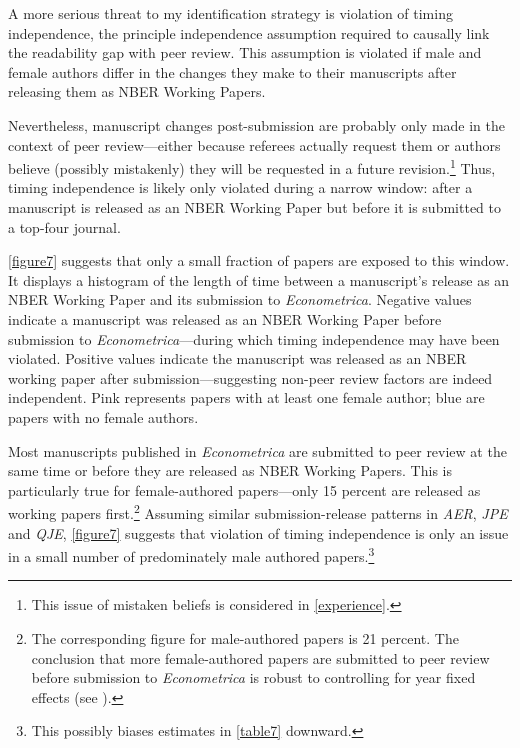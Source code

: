 A more serious threat to my identification strategy is violation of timing independence, the principle independence assumption required to causally link the readability gap with peer review. This assumption is violated if male and female authors differ in the changes they make to their manuscripts after releasing them as NBER Working Papers.

Nevertheless, manuscript changes post-submission are probably only made in the context of peer review---either because referees actually request them or authors believe (possibly mistakenly) they will be requested in a future revision.\footnote{This issue of mistaken beliefs is considered in \autoref{experience}.} Thus, timing independence is likely only violated during a narrow window: after a manuscript is released as an NBER Working Paper but before it is submitted to a top-four journal.

\autoref{figure7} suggests that only a small fraction of papers are exposed to this window. It displays a histogram of the length of time between a manuscript's release as an NBER Working Paper and its submission to \emph{Econometrica}. Negative values indicate a manuscript was released as an NBER Working Paper before submission to \emph{Econometrica}---during which timing independence may have been violated. Positive values indicate the manuscript was released as an NBER working paper after submission---suggesting non-peer review factors are indeed independent. Pink represents papers with at least one female author; blue are papers with no female authors.



Most manuscripts published in \emph{Econometrica} are submitted to peer review at the same time or before they are released as NBER Working Papers. This is particularly true for female-authored papers---only 15 percent are released as working papers first.\footnote{The corresponding figure for male-authored papers is 21 percent. The conclusion that more female-authored papers are submitted to peer review before submission to \emph{Econometrica} is robust to controlling for year fixed effects (see ).} Assuming similar submission-release patterns in \emph{AER}, \emph{JPE} and \emph{QJE}, \autoref{figure7} suggests that violation of timing independence is only an issue in a small number of predominately male authored papers.\footnote{This possibly biases estimates in \autoref{table7} downward.}


